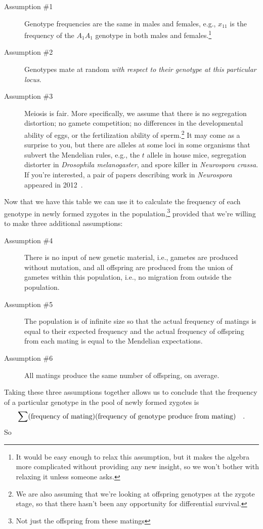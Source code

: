 \documentclass[12pt]{article}
\begin{document}
\begin{description}

\item[Assumption \#1] Genotype frequencies are the same in males and
  females, e.g., $x_{11}$ is the frequency of the $A_1A_1$ genotype in
  both males and females.\footnote{It would be easy enough to relax
    this assumption, but it makes the algebra more complicated without
    providing any new insight, so we won't bother with relaxing it
    unless someone asks.}

\item[Assumption \#2] Genotypes mate at random {\it with respect to
  their genotype at this particular locus}.

\item[Assumption \#3] Meiosis is fair. More specifically, we assume
  that there is no segregation distortion; no gamete competition; no
  differences in the developmental ability of eggs, or the
  fertilization ability of sperm.\footnote{We are also assuming that
    we're looking at offspring genotypes at the zygote stage, so that
    there hasn't been any opportunity for differential survival.} It
  may come as a surprise to you, but there are alleles at some loci in
  some organisms that subvert the Mendelian rules, e.g., the $t$
  allele in house mice, segregation distorter in {\it Drosophila
    melanogaster}, and spore killer in {\it Neurospora crassa\/}. If
  you're interested, a pair of papers describing work in {\it
    Neurospora\/} appeared in 2012~\cite{Hammond-etal-2012,Saupe-2012}.

\end{description}
Now that we have this table we can use it to calculate the frequency
of each genotype in newly formed zygotes in the
population,\footnote{Not just the offspring from these matings}
provided that we're willing to make three additional assumptions:

\begin{description}

\item[Assumption \#4] There is no input of new genetic material, i.e.,
gametes are produced without mutation, and all offspring are produced
from the union of gametes within this population, i.e., no migration
from outside the population.

\item[Assumption \#5] The population is of infinite size so that the
actual frequency of matings is equal to their expected frequency and
the actual frequency of offspring from each mating is equal to the
Mendelian expectations.

\item[Assumption \#6] All matings produce the same number of
offspring, on average.

\end{description}
Taking these three assumptions together allows us to conclude that the
frequency of a particular genotype in the pool of newly formed zygotes
is
\[
\sum(\hbox{frequency of mating})(\hbox{frequency of genotype produce
  from mating}) \quad .
\]
So
\end{document}
